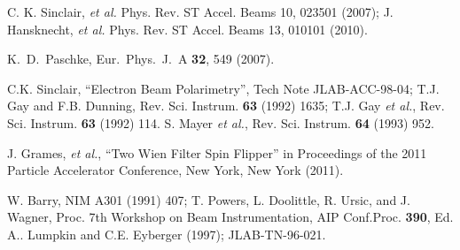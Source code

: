 \begin{thebibliography}{99}
C. K. Sinclair, {\it et al.} Phys. Rev. ST Accel. Beams 10, 023501 (2007);
J. Hansknecht, {\it et al.} Phys. Rev. ST Accel. Beams 13, 010101 (2010).

  K.~D.~Paschke,
  Eur.\ Phys.\ J.\  A {\bf 32}, 549 (2007).

 C.K. Sinclair, ``Electron
Beam Polarimetry'', Tech Note JLAB-ACC-98-04;
T.J. Gay and F.B. Dunning, Rev. Sci. Instrum.
{\bf 63} (1992) 1635; T.J. Gay {\em et al.},
Rev. Sci. Instrum. {\bf 63} (1992) 114.  
S. Mayer {\em et al.}, Rev. Sci. Instrum.
{\bf 64} (1993) 952. 

J. Grames, {\it et al.},
``Two Wien Filter Spin Flipper'' in Proceedings of the 2011 Particle
Accelerator Conference, New York, New York (2011).

W. Barry, NIM A301 (1991) 407;
T. Powers, L. Doolittle, R. Ursic, and J. Wagner, 
Proc. 7th Workshop on Beam Instrumentation, AIP Conf.Proc. {\bf 390},
Ed. A.. Lumpkin and C.E. Eyberger (1997); JLAB-TN-96-021.




\end{thebibliography}
